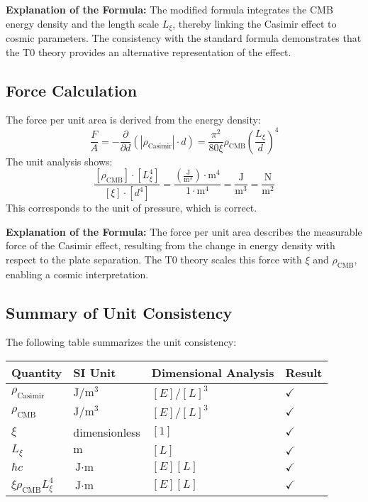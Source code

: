 \documentclass{article}
\begin{document}
	\textbf{Explanation of the Formula:} The modified formula integrates the CMB energy density and the length scale $L_\xi$, thereby linking the Casimir effect to cosmic parameters. The consistency with the standard formula demonstrates that the T0 theory provides an alternative representation of the effect.
	
	\subsection{Force Calculation}
	The force per unit area is derived from the energy density:
	\begin{equation}
		\frac{F}{A} = -\frac{\partial}{\partial d} \left( |\rho_{\text{Casimir}}| \cdot d \right) = \frac{\pi^2}{80 \xi} \rho_{\text{CMB}} \left( \frac{L_\xi}{d} \right)^4
	\end{equation}
	The unit analysis shows:
	\begin{equation}
		\frac{[\rho_{\text{CMB}}] \cdot [L_\xi^4]}{[\xi] \cdot [d^4]} = \frac{\left( \frac{\text{J}}{\text{m}^3} \right) \cdot \text{m}^4}{1 \cdot \text{m}^4} = \frac{\text{J}}{\text{m}^3} = \frac{\text{N}}{\text{m}^2}
	\end{equation}
	This corresponds to the unit of pressure, which is correct.
	
	\textbf{Explanation of the Formula:} The force per unit area describes the measurable force of the Casimir effect, resulting from the change in energy density with respect to the plate separation. The T0 theory scales this force with $\xi$ and $\rho_{\text{CMB}}$, enabling a cosmic interpretation.
	
	\subsection{Summary of Unit Consistency}
	The following table summarizes the unit consistency:
	\begin{table}[h]
		\centering
		\begin{tabular}{l l l l}
			\toprule
			Quantity & SI Unit & Dimensional Analysis & Result \\
			\midrule
			$\rho_{\text{Casimir}}$ & $\text{J}/\text{m}^3$ & $[E]/[L]^3$ & $\checkmark$ \\
			$\rho_{\text{CMB}}$ & $\text{J}/\text{m}^3$ & $[E]/[L]^3$ & $\checkmark$ \\
			$\xi$ & dimensionless & $[1]$ & $\checkmark$ \\
			$L_\xi$ & $\text{m}$ & $[L]$ & $\checkmark$ \\
			$\hbar c$ & $\text{J} \cdot \text{m}$ & $[E][L]$ & $\checkmark$ \\
			$\xi \rho_{\text{CMB}} L_\xi^4$ & $\text{J} \cdot \text{m}$ & $[E][L]$ & $\checkmark$ \\
			\bottomrule
		\end{tabular}
	\end{table}
	
\end{document}
